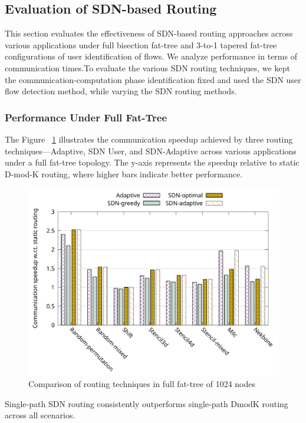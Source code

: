 \subsection{Evaluation of SDN-based Routing}
This section evaluates the effectiveness of SDN-based routing approaches across various applications under full bisection fat-tree and 3-to-1 tapered fat-tree configurations of user identification of flows. We analyze performance in terms of communication times.To evaluate the various SDN routing techniques, we kept the communication‑computation phase identification fixed and used the SDN user flow detection method, while varying the SDN routing methods.

\subsubsection{Performance Under Full Fat-Tree}
The Figure ~\ref{fig:routing_full} illustrates the communication speedup achieved by three routing techniques—Adaptive, SDN User, and SDN-Adaptive across various applications under a full fat-tree topology. The y-axis represents the speedup relative to static D-mod-K routing, where higher bars indicate better performance.


\begin{figure}[h]
  \centering
  \includegraphics[width=\columnwidth]{./figs_4/routing_full.pdf}
  \caption{Comparison of routing techniques in full fat-tree of 1024 nodes}
  \label{fig:routing_full}
\end{figure}
Single-path SDN routing consistently outperforms single-path DmodK routing across all scenarios.

